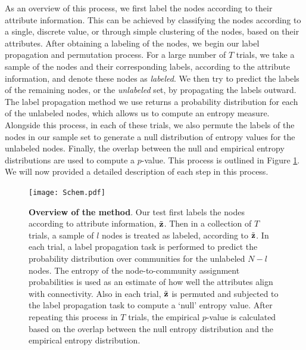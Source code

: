 \indent As an overview of this process, we first label the nodes according to their attribute information. This can be achieved by classifying the nodes according to a single, discrete value, or through simple clustering of the nodes, based on their attributes. After obtaining a labeling of the nodes, we begin our label propagation and permutation process. For a large number of $T$ trials, we take a sample of the nodes and their corresponding labels, according to the attribute information, and denote these nodes as \emph{labeled}. We then try to predict the labels of the remaining nodes, or the \emph{unlabeled} set, by propagating the labels outward. The label propagation method we use returns a probability distribution for each of the unlabeled nodes, which allows us to compute an entropy measure. Alongside this process, in each of these trials, we also permute the labels of the nodes in our sample set to generate a null distribution of entropy values for the unlabeled nodes. Finally, the overlap between the null and empirical entropy distributions are used to compute a $p$-value. This process is outlined in Figure \ref{Overview}. We will now provided a detailed description of each step in this process. 

\begin{figure}[h!]
\centering
\begin{center}
\texttt{[image: Schem.pdf]}
\caption{{\bf Overview of the method}. Our test first labels the nodes according to attribute information, $\tilde{{\bf z}}$. Then in a collection of $T$ trials, a sample of $l$ nodes is treated as labeled, according to $\tilde{{\bf z}}$. In each trial, a label propagation task is performed to predict the probability distribution over communities for the unlabeled $N-l$ nodes. The entropy of the node-to-community assignment probabilities is used as an estimate of how well the attributes align with connectivity. Also in each trial, $\tilde{{\bf z}}$ is permuted and subjected to the label propagation task to compute a `null' entropy value. After repeating this process in $T$ trials, the empirical $p$-value is calculated based on the overlap between the null entropy distribution and the empirical entropy distribution.}
\label{Overview}
\end{center}
\end{figure}

